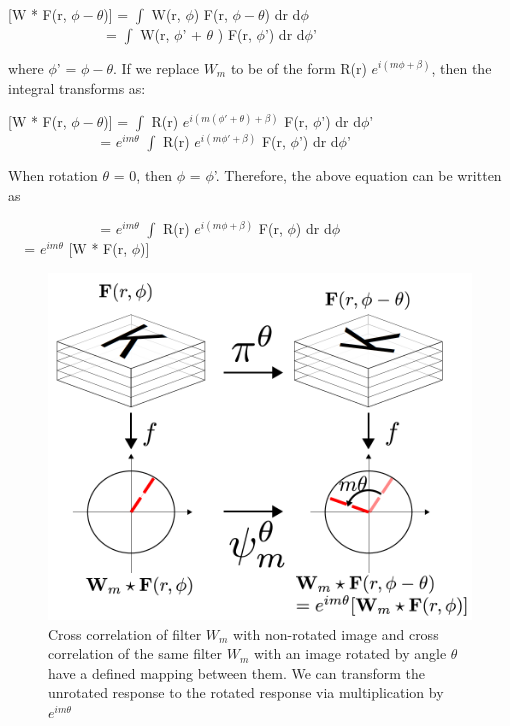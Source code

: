 \documentclass{article}
\begin{document}
\vspace{-0.1cm}
\begin{center} 
[W * F(r, $\phi - \theta$)] = $\int$ W(r, $\phi$) F(r, $\phi - \theta$) dr d$\phi$ \\ \vspace{0.1cm}
$\hspace{80pt}$ = $\int$ W(r, $\phi$' + $\theta$ ) F(r, $\phi$') dr d$\phi$'
\end{center}
where $\phi$' = $\phi - \theta$. If we replace $W_m$ to be of the form R(r) $e^{i(m \phi + \beta)}$, then the integral transforms as:
\vspace{-0.1cm}
\begin{center} 
[W * F(r, $\phi - \theta$)] = $\int$ R(r) $e^{i(m (\phi' + \theta) + \beta)}$ F(r, $\phi$') dr d$\phi$' \\ \vspace{0.1cm}
$\hspace{75pt}$ = $e^{i m \theta}$ $\int$ R(r) $e^{i(m \phi' + \beta)}$ F(r, $\phi$') dr d$\phi$'
\end{center}
When rotation $\theta$ = 0, then $\phi$ = $\phi$'. Therefore, the above equation can be written as
\vspace{-0.1cm}
\begin{center} 
$\hspace{75pt}$ = $e^{i m \theta}$ $\int$ R(r) $e^{i(m \phi + \beta)}$ F(r, $\phi$) dr d$\phi$ \\ \vspace{0.1cm}
$\hspace{10pt}$ = $e^{i m \theta}$ [W * F(r, $\phi$)] 
\end{center}

\begin{figure}[t!]
  \includegraphics[width=\linewidth]{EffectOfImageRotation.png}
  \caption{Cross correlation of filter $W_m$ with non-rotated image and cross correlation of the same filter $W_m$ with an image rotated by angle $\theta$ have a defined mapping between them. We can transform the unrotated response to the rotated response via multiplication by $e^{i m \theta}$}
  \label{fig:rotatedCrossCorrelation}
\end{figure}
\end{document}
